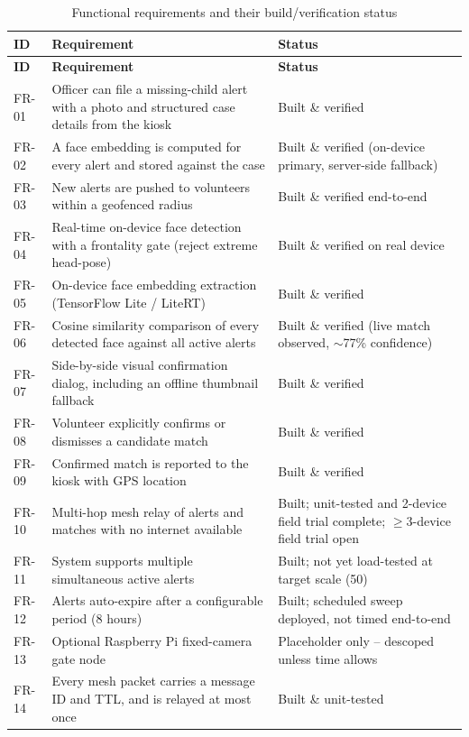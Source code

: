 \documentclass[12pt,a4paper,oneside]{report}
\begin{document}
\begin{longtable}{|p{1.4cm}|p{7.8cm}|p{3.6cm}|}
\caption{Functional requirements and their build/verification status}
\label{tab:fr}\\
\hline
\textbf{ID} & \textbf{Requirement} & \textbf{Status} \\
\hline
\endfirsthead
\hline
\textbf{ID} & \textbf{Requirement} & \textbf{Status} \\
\hline
\endhead
FR-01 & Officer can file a missing-child alert with a photo and structured case details from the kiosk & Built \& verified \\ \hline
FR-02 & A face embedding is computed for every alert and stored against the case & Built \& verified (on-device primary, server-side fallback) \\ \hline
FR-03 & New alerts are pushed to volunteers within a geofenced radius & Built \& verified end-to-end \\ \hline
FR-04 & Real-time on-device face detection with a frontality gate (reject extreme head-pose) & Built \& verified on real device \\ \hline
FR-05 & On-device face embedding extraction (TensorFlow Lite / LiteRT) & Built \& verified \\ \hline
FR-06 & Cosine similarity comparison of every detected face against all active alerts & Built \& verified (live match observed, $\sim$77\% confidence) \\ \hline
FR-07 & Side-by-side visual confirmation dialog, including an offline thumbnail fallback & Built \& verified \\ \hline
FR-08 & Volunteer explicitly confirms or dismisses a candidate match & Built \& verified \\ \hline
FR-09 & Confirmed match is reported to the kiosk with GPS location & Built \& verified \\ \hline
FR-10 & Multi-hop mesh relay of alerts and matches with no internet available & Built; unit-tested and 2-device field trial complete; $\geq$3-device field trial open \\ \hline
FR-11 & System supports multiple simultaneous active alerts & Built; not yet load-tested at target scale (50) \\ \hline
FR-12 & Alerts auto-expire after a configurable period (8 hours) & Built; scheduled sweep deployed, not timed end-to-end \\ \hline
FR-13 & Optional Raspberry Pi fixed-camera gate node & Placeholder only -- descoped unless time allows \\ \hline
FR-14 & Every mesh packet carries a message ID and TTL, and is relayed at most once & Built \& unit-tested \\
\hline
\end{longtable}
\end{document}
